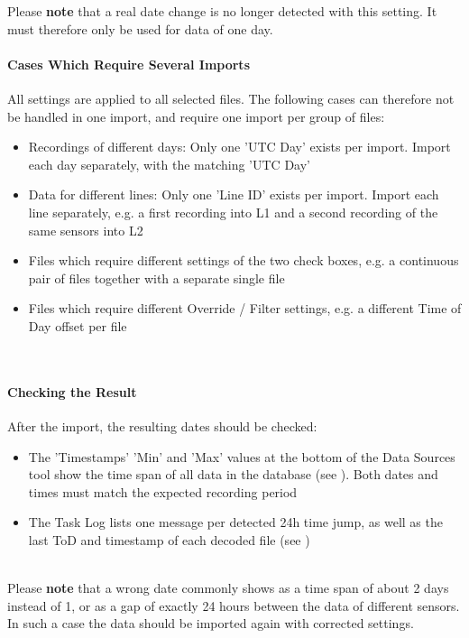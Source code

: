 Please \textbf{note} that a real date change is no longer detected with this setting. It must therefore only be used for data of one day. \\

\paragraph{Cases Which Require Several Imports}

All settings are applied to all selected files. The following cases can therefore not be handled in one import, and require one import per group of files:

\begin{itemize}
\item Recordings of different days: Only one 'UTC Day' exists per import. Import each day separately, with the matching 'UTC Day'
\item Data for different lines: Only one 'Line ID' exists per import. Import each line separately, e.g. a first recording into L1 and a second recording of the same sensors into L2
\item Files which require different settings of the two check boxes, e.g. a continuous pair of files together with a separate single file
\item Files which require different Override / Filter settings, e.g. a different Time of Day offset per file
\end{itemize}
\ \\

\paragraph{Checking the Result}

After the import, the resulting dates should be checked:

\begin{itemize}
\item The 'Timestamps' 'Min' and 'Max' values at the bottom of the Data Sources tool show the time span of all data in the database (see ). Both dates and times must match the expected recording period
\item The Task Log lists one message per detected 24h time jump, as well as the last ToD and timestamp of each decoded file (see )
\end{itemize}
\ \\

Please \textbf{note} that a wrong date commonly shows as a time span of about 2 days instead of 1, or as a gap of exactly 24 hours between the data of different sensors. In such a case the data should be imported again with corrected settings.


